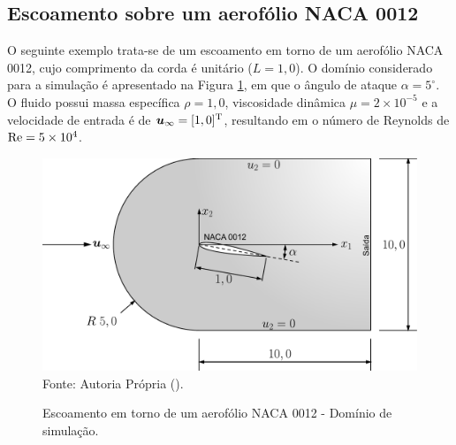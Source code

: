 \subsection{Escoamento sobre um aerofólio NACA 0012} \label{ex:NACA0012}

O seguinte exemplo trata-se de um escoamento em torno de um aerofólio NACA 0012, cujo comprimento da corda é unitário ($L=1,0$). O domínio considerado para a simulação é apresentado na Figura \ref{fig:NACA0012}, em que o ângulo de ataque $\alpha=5^{\circ}$. O fluido possui massa específica $\rho=1,0$, viscosidade dinâmica $\mu=2\times10^{-5}$ e a velocidade de entrada é de $\boldsymbol{u}_\infty=[1,0]^\mathrm{T}$, resultando em o número de Reynolds de $\mathrm{Re}=5\times10^4$.

\begin{figure}[h!]
    \centering
    \caption{Escoamento em torno de um aerofólio NACA 0012 - Domínio de simulação.}
    \includegraphics[width=.7\linewidth]{Figuras/NACA0012/NACA0012.pdf}
    \\Fonte: Autoria Própria (\the\year).
    \label{fig:NACA0012}
\end{figure}

